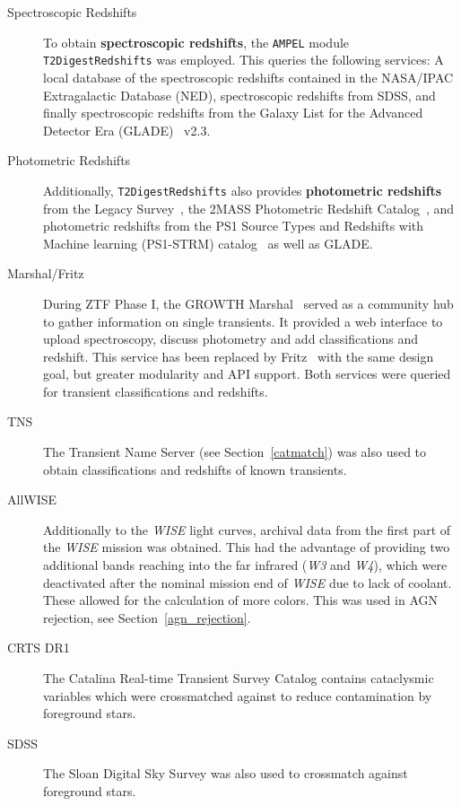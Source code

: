 \begin{description}
    \item[Spectroscopic Redshifts] To obtain \textbf{spectroscopic redshifts}, the \texttt{AMPEL} module \texttt{T2DigestRedshifts} was employed. This queries the following services: A local database of the spectroscopic redshifts contained in the NASA/IPAC Extragalactic Database (NED), spectroscopic redshifts from SDSS, and finally spectroscopic redshifts from the Galaxy List for the Advanced Detector Era (GLADE)~ v2.3.
    \item[Photometric Redshifts] Additionally, \texttt{T2DigestRedshifts} also provides \textbf{photometric redshifts} from the Legacy Survey~, the 2MASS Photometric Redshift Catalog~, and photometric redshifts from the PS1 Source Types and Redshifts with Machine learning (PS1-STRM) catalog~ as well as GLADE.
    \item[Marshal/Fritz] During ZTF Phase I, the GROWTH Marshal~ served as a community hub to gather information on single transients. It provided a web interface to upload spectroscopy, discuss photometry and add classifications and redshift. This service has been replaced by Fritz~ with the same design goal, but greater modularity and API support. Both services were queried for transient classifications and redshifts.
    \item[TNS] The Transient Name Server (see Section~\ref{catmatch}) was also used to obtain classifications and redshifts of known transients.
    \item[AllWISE] Additionally to the \textit{WISE} light curves, archival data from the first part of the \textit{WISE} mission was obtained. This had the advantage of providing two additional bands reaching into the far infrared (\textit{W3} and \textit{W4}), which were deactivated after the nominal mission end of \textit{WISE} due to lack of coolant. These allowed for the calculation of more colors. This was used in AGN rejection, see Section~\ref{agn_rejection}.
    \item[CRTS DR1] The Catalina Real-time Transient Survey Catalog contains cataclysmic variables which were crossmatched against to reduce contamination by foreground stars.
    \item[SDSS] The Sloan Digital Sky Survey was also used to crossmatch against foreground stars.
\end{description}

